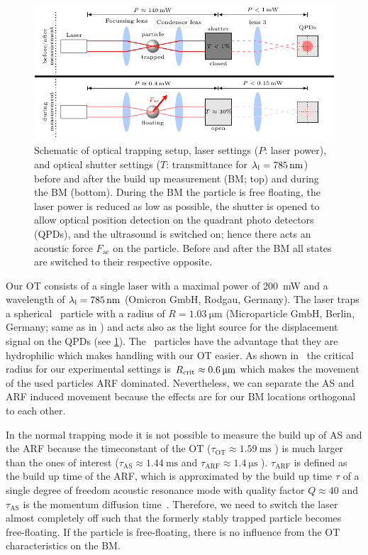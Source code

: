 \begin{figure}[tbp]
  \centering
  \includegraphics[width=\textwidth]{External/PU-protocol.pdf}
  \caption{Schematic of optical trapping setup, laser settings ($P$: laser 
    power), and optical shutter settings ($T$: transmittance for $\llaser = 
    \SI{785}{\nm}$) before and after the build up measurement (BM; top) and 
    during the BM (bottom). During the BM the particle is free floating, the 
    laser power is reduced as low as possible, the shutter is opened to allow 
    optical position detection on the quadrant photo detectors (QPDs), and the 
    ultrasound is switched on; hence there acts an acoustic force 
    $F_{\mathrm{ac}}$ on the particle. Before and after the BM all states are 
switched to their respective opposite.}\label{fig:PU-protocol}
\end{figure}

Our OT consists of a single laser with a maximal power of \SI{200}{\milli\watt} 
and a wavelength of $\llaser = \SI{785}{\nm}$ (Omicron GmbH, Rodgau, Germany). 
The laser traps a spherical \SiO~particle with a radius of $R=\SI{1.03}{\um}$ 
(Microparticle GmbH, Berlin, Germany; same as in \cite{Goering2021}) and acts 
also as the light source for the displacement signal on the QPDs (see 
\cref{fig:PU-protocol}). The \SiO~particles have the advantage that they are 
hydrophilic which makes handling with our OT easier. As shown 
in~\cite{Goering2021} the critical radius for our experimental settings is 
$R_{\mathrm{crit}}\approx\SI{0.6}{\si{\micro\meter}}$ which makes the movement of the used particles ARF 
dominated. Nevertheless, we can separate the AS and ARF induced movement 
because the effects are for our BM locations orthogonal to each other.

In the normal trapping mode it is not possible to measure the build up of AS 
and the ARF because the timeconstant of the OT ($\tau_{\mathrm{OT}}\approx 
\SI{1.59}{\ms}$ \cite{Goering2021}) is much larger than the ones of interest 
($\tau_{\mathrm{AS}}\approx \SI{1.44}{\ms}$ and $\tau_{\mathrm{ARF}}\approx 
\SI{1.4}{\us}$ \cite{Goering2021}). $\tau_{\mathrm{ARF}}$ is defined as the 
build up time of the ARF, which is approximated by the build up time $\tau$ of 
a single degree of freedom acoustic resonance mode with quality factor 
$Q\approx 40$ and $\tau_{\mathrm{AS}}$ is the momentum diffusion 
time~\cite{Muller2015}. Therefore, we need to switch the laser almost 
completely off such that the formerly stably trapped particle becomes 
free-floating. If the particle is free-floating, there is no influence from the 
OT characteristics on the BM.

